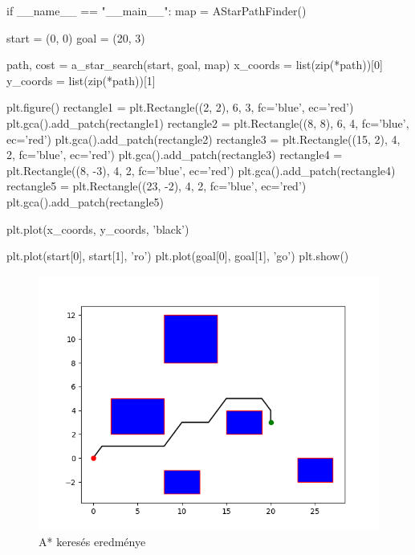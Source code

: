 \begin{python}
if __name__ == "__main__":
    map = AStarPathFinder()

    start = (0, 0)
    goal = (20, 3)

    path, cost = a_star_search(start, goal, map)
    x_coords = list(zip(*path))[0]
    y_coords = list(zip(*path))[1]
    
    plt.figure()
    rectangle1 = plt.Rectangle((2, 2), 6, 3, fc='blue', ec='red')
    plt.gca().add_patch(rectangle1)
    rectangle2 = plt.Rectangle((8, 8), 6, 4, fc='blue', ec='red')
    plt.gca().add_patch(rectangle2)
    rectangle3 = plt.Rectangle((15, 2), 4, 2, fc='blue', ec='red')
    plt.gca().add_patch(rectangle3)
    rectangle4 = plt.Rectangle((8, -3), 4, 2, fc='blue', ec='red')
    plt.gca().add_patch(rectangle4)
    rectangle5 = plt.Rectangle((23, -2), 4, 2, fc='blue', ec='red')
    plt.gca().add_patch(rectangle5)
    
    plt.plot(x_coords, y_coords, 'black')

    plt.plot(start[0], start[1], 'ro')
    plt.plot(goal[0], goal[1], 'go')
    plt.show()
\end{python}


\begin{figure}[h!]
\centering
\includegraphics[scale=0.75]{images/a_star.png}
\caption{A* keresés eredménye}
\label{fig:a_star}
\end{figure}

\newpage

